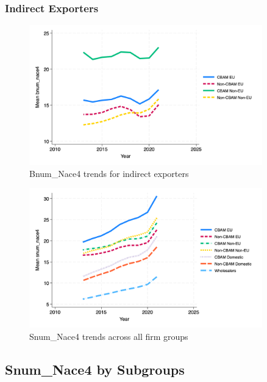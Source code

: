 \documentclass{article}
\begin{document}
\subsubsection{Indirect Exporters}
\begin{figure}[h!]
\centering
\includegraphics[width=0.9\textwidth]{bnum_nace4_indir.png}
\caption{Bnum_Nace4 trends for indirect exporters}
\label{fig:bnum_nace4_indir}
\end{figure}

\begin{figure}[h!]
\centering
\includegraphics[width=0.9\textwidth]{snum_nace4_main_groups.png}
\caption{Snum_Nace4 trends across all firm groups}
\label{fig:snum_nace4_main}
\end{figure}

\subsection{Snum_Nace4 by Subgroups}
\end{document}
